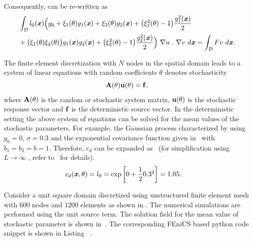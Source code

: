 \documentclass[letter,1p,11pt,oneside,onecolumn,sort&compress]{elsarticle}
\begin{document}
Consequently,  can be re-written as
\begin{align}\label{eq:stoVar2}
  & \int_{\mathcal{D}} l_0(\textbf{\textit{x}}) \Big( g_0 + \xi_1(\theta) g_1(\textbf{\textit{x}}) + \xi_2(\theta) g_2(\textbf{\textit{x}}) + \big(\xi_1^2(\theta)-1 \big) \frac{g_1^2(\textbf{\textit{x}})}{2} \nonumber \\
  &+  \big( \xi_1(\theta) \xi_2(\theta) \big) g_1(\textbf{\textit{x}}) g_2(\textbf{\textit{x}}) + \big( \xi_2^2(\theta)-1 \big) \frac{g_2^2(\textbf{\textit{x}})}{2} \Big) \ \nabla u \ . \ \nabla v \ d\textbf{\textit{x}} = \int_{\mathcal{D}} F v \ d\textbf{\textit{x}}.
\end{align}

The finite element discretization with $N$ nodes in the spatial domain leads to a system of linear equations with random coefficients $\theta$ denotes stochasticity~\cite{ghanemSFEM1991}
\begin{equation}\label{eq:dFEM}
{\mathrm{\bf{A}(\theta) \bf{u}(\theta) = \bf{f}}},
\end{equation}
where ${\mathrm{\bf{A}}(\theta)}$ is the random or stochastic system matrix, $ \bf{u}(\theta)$ is the stochastic response vector and $\bf{f}$ is the deterministic source vector. In the deterministic setting the above system of equations can be solved for the mean values of the stochastic parameters. For example, the Gaussian process characterized by using $g_0 = 0$, $\sigma=0.3$ and the exponential covariance function given in~ with $b_1=b_2=b=1$. Therefore, $c_d$ can be expanded as~\cite{ghanemSFEM1991} (for simplification using $L\rightarrow \infty$
, refer to~\cite{ghanem1999ingredients,ghanem1999nonlinear} for details). %
\begin{align}\label{eq:logPCE}
c_d(\textbf{\textit{x}},\theta) &= l_0 = \mathrm{exp} \left[  0 + \frac{1}{2}{0.3}^2 \right] = 1.05.
\end{align}

Consider a unit square domain discretized using unstructured finite element mesh with $600$ nodes and $1200$ elements as shown in . The numerical simulations are performed using
the unit source term.
The solution field for the mean value of stochastic parameter is shown in~.
The corresponding FEniCS based python code snippet is shown in Listing ~\cite{desai2019scalable}. %
\end{document}
